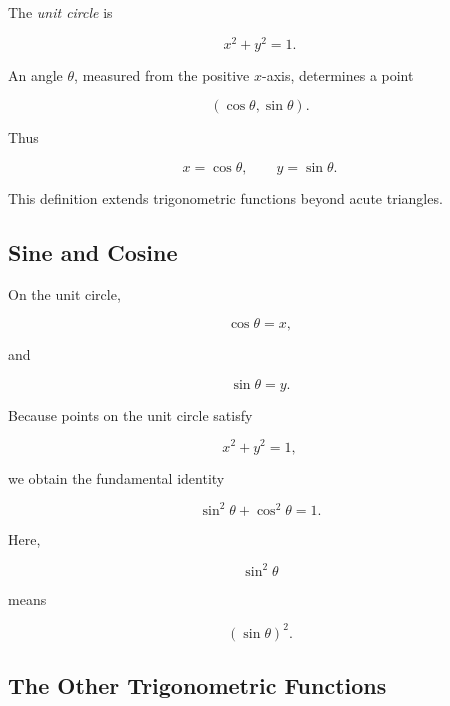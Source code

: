 The \emph{unit circle} is

\[ x^2+y^2=1. \]

An angle \(\theta\), measured from the positive \(x\)-axis, determines a point

\[ (\cos\theta,\sin\theta). \]

Thus

\[ x=\cos\theta,\qquad y=\sin\theta. \]

\begin{center}
\end{center}

This definition extends trigonometric functions beyond acute triangles.

\subsection{Sine and Cosine}
\label{subsec:sine-cosine-functions}

On the unit circle,

\[ \cos\theta=x, \]

and

\[ \sin\theta=y. \]

Because points on the unit circle satisfy

\[ x^2+y^2=1, \]

we obtain the fundamental identity

\[ \boxed{\sin^2\theta+\cos^2\theta=1.} \]

Here,

\[ \sin^2\theta \]

means

\[ (\sin\theta)^2. \]

\subsection{The Other Trigonometric Functions}
\label{subsec:other-trigonometric-functions}

